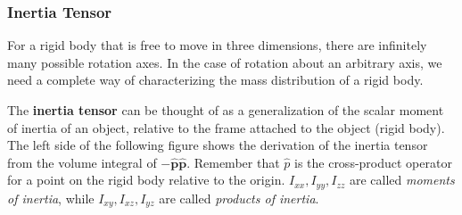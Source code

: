 \subsubsection{Inertia Tensor}

For a rigid body that is free to move in three dimensions, there are infinitely many possible rotation axes. In the case of rotation about an arbitrary axis, we need a complete way of characterizing the mass distribution of a rigid body. 

The \textbf{inertia tensor} can be
thought of as a generalization of the scalar moment of inertia of an object, relative to the frame attached to the object (rigid body). The left side of the following figure shows the derivation of the inertia tensor from the volume integral of $-\mathbf{\hat{p}}\mathbf{\hat{p}}$. Remember that $\hat{p}$ is the cross-product operator for a point on the rigid body relative to the origin. $I_{xx}, I_{yy}, I_{zz}$ are called \textit{moments of inertia}, while $I_{xy}, I_{xz}, I_{yz}$ are called \textit{products of inertia}.

